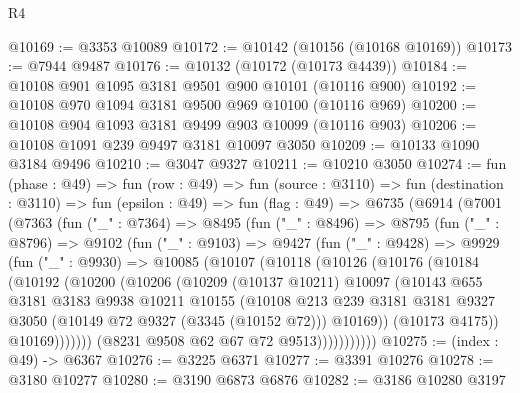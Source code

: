 \begin{lexlean}{R4}
\begin{coremodule}
@10169 := @3353 @10089
@10172 := @10142 (@10156 (@10168 @10169))
@10173 := @7944 @9487
@10176 := @10132 (@10172 (@10173 @4439))
@10184 := @10108 @901 @1095 @3181 @9501 @900 @10101 (@10116 @900)
@10192 := @10108 @970 @1094 @3181 @9500 @969 @10100 (@10116 @969)
@10200 := @10108 @904 @1093 @3181 @9499 @903 @10099 (@10116 @903)
@10206 := @10108 @1091 @239 @9497 @3181 @10097 @3050
@10209 := @10133 @1090 @3184 @9496
@10210 := @3047 @9327
@10211 := @10210 @3050
@10274 := fun (phase : @49) =>
  fun (row : @49) =>
  fun (source : @3110) =>
  fun (destination : @3110) =>
  fun (epsilon : @49) =>
  fun (flag : @49) =>
  @6735
    (@6914
      (@7001
        (@7363
          (fun ("_" : @7364) =>
          @8495
            (fun ("_" : @8496) =>
            @8795
              (fun ("_" : @8796) =>
              @9102
                (fun ("_" : @9103) =>
                @9427
                  (fun ("_" : @9428) =>
                  @9929
                    (fun ("_" : @9930) =>
                    @10085
                      (@10107
                        (@10118
                          (@10126
                            (@10176
                              (@10184
                                (@10192
                                  (@10200
                                    (@10206
                                      (@10209
                                        (@10137 @10211)
                                        @10097
                                        (@10143
                                          @655
                                          @3181
                                          @3183
                                          @9938
                                          @10211
                                          @10155
                                          (@10108
                                            @213
                                            @239
                                            @3181
                                            @3181
                                            @9327
                                            @3050
                                            (@10149 @72 @9327 (@3345 (@10152 @72)))
                                            @10169))
                                        (@10173 @4175))
                                      @10169)))))))
                        (@8231 @9508 @62 @67 @72 @9513)))))))))))
@10275 := (index : @49) -> @6367
@10276 := @3225 @6371
@10277 := @3391 @10276
@10278 := @3180 @10277
@10280 := @3190 @6873 @6876
@10282 := @3186 @10280 @3197

\end{coremodule}
\end{lexlean}
